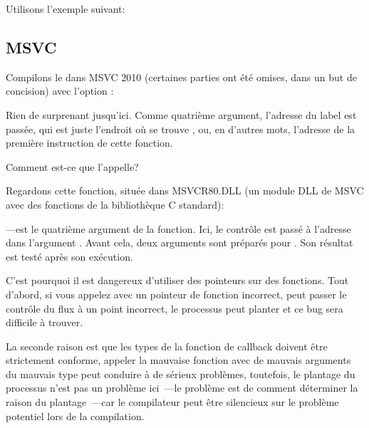 Utilisons l'exemple suivant:



\subsection{MSVC}

Compilons le dans MSVC 2010 (certaines parties ont été omises, dans un but de concision)
avec l'option \TT{\Ox}:



Rien de surprenant jusqu'ici.
Comme quatrième argument, l'adresse du label  est passée, qui est juste
l'endroit où se trouve \comp, ou, en d'autres mots, l'adresse de la première instruction
de cette fonction.

Comment est-ce que \qsort l'appelle?


Regardons cette fonction, située dans MSVCR80.DLL (un module DLL de MSVC avec des
fonctions de la bibliothèque C standard):



---est le quatrième argument de la fonction.
Ici, le contrôle est passé à l'adresse dans l'argument .
Avant cela, deux arguments sont préparés pour \comp. Son résultat est testé après
son exécution.

C'est pourquoi il est dangereux d'utiliser des pointeurs sur des fonctions.
Tout d'abord, si vous appelez \qsort avec un pointeur de fonction incorrect, \qsort
peut passer le contrôle du flux à un point incorrect, le processus peut planter et
ce bug sera difficile à trouver.

La seconde raison est que les types de la fonction de callback doivent être strictement
conforme, appeler la mauvaise fonction avec de mauvais arguments du mauvais type peut
conduire à de sérieux problèmes, toutefois, le plantage du processus n'est pas un
problème ici~---le problème est de comment déterminer la raison du plantage~---car
le compilateur peut être silencieux sur le problème potentiel lors de la compilation.



